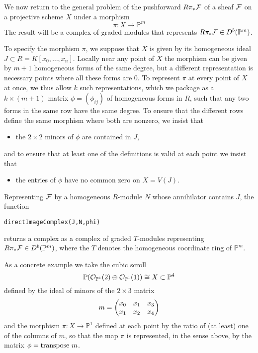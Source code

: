 \documentclass[twoside,12pt, leqno]{amsart}
\def\PP{{\mathbb P}}
\begin{document}
We now return to the general problem of the pushforward $R\pi_* {\mathcal F}$ of a sheaf ${\mathcal F}$ on a projective scheme $X$ under a morphism 
$$
\pi \colon X \to \PP^m
$$
The result will be a complex of graded modules that represents
$R\pi_* \sF \in D^b(\PP^m)$.

To specify the morphism $\pi$, we suppose that $X$ is given by its homogeneous ideal $J \subset R = K[x_0,\ldots,x_n]$. Locally near any point of $X$ the morphism can be given by $m+1$ homogeneous
forms of the same degree, but a different representation is necessary points where all these forms are 0. To represent $\pi$
at every point of $X$ at once, we thus allow $k$ such representations, which we package as a
 $k \times (m+1)$ matrix $\phi=(\phi_{ij})$ of homogeneous forms in $R$, such that any two forms
 in the same row have the same degree. To ensure that the different rows define the same
 morphism where both are nonzero, we insist that
 \begin{itemize}
\item the $2\times 2$ minors of $\phi$ are contained in $J$,
\end{itemize}
and to ensure that at least one of the definitions is valid at each point we insist that
\begin{itemize}
\item the entries of $\phi$ have no common zero on $X=V(J)$.
\end{itemize}

Representing ${\mathcal F}$ by  a homogeneous $R$-module $N$
whose annihilator contains $J$, the function
{\small \begin{verbatim}
directImageComplex(J,N,phi)
\end{verbatim} }
returns a complex as a complex of graded $T$-modules representing $R\pi_* \sF \in D^b(\PP^m)$, where the $T$ denotes  the homogeneous coordinate ring of $\PP^m$.

As a concrete example we take the cubic scroll 
$$\PP(\sO_{\PP^1}(2) \oplus \sO_{\PP^1}(1))\cong X\subset \PP^4
$$ 
defined by the ideal of minors of the $2\times 3$ matrix
$$
m=\begin{pmatrix}
x_0& x_1 & x_3 \cr
x_1 & x_2 & x_4 \cr
\end{pmatrix}   
$$
and the morphism $\pi :X \to \PP^1$ defined at each point by the ratio of (at least) one of 
the columns of $m$, so that the map $\pi$ is represented, in the sense above,
by the matrix $\phi = {\rm transpose}\ m$. 
\end{document}
